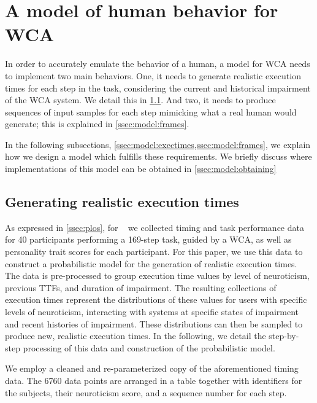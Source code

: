 \section{A model of human behavior for \ac{WCA}}\label{sec:model}


In order to accurately emulate the behavior of a human, a model for \ac{WCA} needs to implement two main behaviors.
One, it needs to generate realistic execution times for each step in the task, considering the current and historical impairment of the \ac{WCA} system.
We detail this in \cref{ssec:model:exectimes}.
And two, it needs to produce sequences of input samples for each step mimicking what a real human would generate; this is explained in \cref{ssec:model:frames}.

In the following subsections, \cref{ssec:model:exectimes,ssec:model:frames}, we explain how we design a model which fulfills these requirements.
We briefly discuss where implementations of this model can be obtained in \cref{ssec:model:obtaining}

\subsection{Generating realistic execution times}\label{ssec:model:exectimes}

As expressed in \cref{ssec:plos}, for ~\cite{olguinmunoz:impact2021} we collected timing and task performance data for \num{40} participants performing a \num{169}-step task, guided by a \ac{WCA}, as well as personality trait scores for each participant.
For this paper, we use this data to construct a probabilistic model for the generation of realistic execution times.
The data is pre-processed to group execution time values by level of neuroticism, previous \acp{TTF}, and duration of impairment.
The resulting collections of execution times represent the distributions of these values for users with specific levels of neuroticism, interacting with systems at specific states of impairment and recent histories of impairment.
These distributions can then be sampled to produce new, realistic execution times.
In the following, we detail the step-by-step processing of this data and construction of the probabilistic model.

We employ a cleaned and re-parameterized copy of the aforementioned timing data.
The \num{6760} data points are arranged in a table together with identifiers for the subjects, their neuroticism score, and a sequence number for each step.

